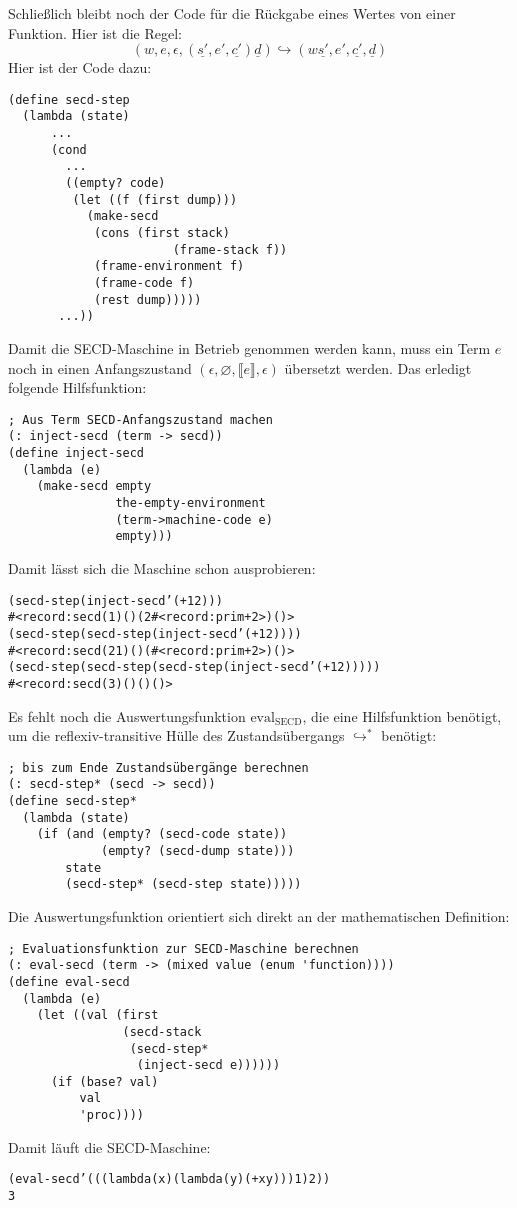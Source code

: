 %
Schließlich bleibt noch der Code für die Rückgabe eines Wertes von
einer Funktion.  Hier ist die Regel:
%
\begin{displaymath}
  (w, e, \epsilon, (\underline{s'}, e', \underline{c'}) \underline{d})
  \hookrightarrow
  (w\underline{s'}, e', \underline{c'}, \underline{d})
\end{displaymath}
%
Hier ist der Code dazu:
%
\begin{verbatim}
(define secd-step
  (lambda (state)
      ...
      (cond
        ...
        ((empty? code)
         (let ((f (first dump)))
           (make-secd
            (cons (first stack)
                       (frame-stack f))
            (frame-environment f)
            (frame-code f)
            (rest dump)))))
       ...))
\end{verbatim}
%
Damit die SECD-Maschine in Betrieb genommen werden kann, muss ein Term
$e$ noch in einen Anfangszustand $(\epsilon, \varnothing, \llbracket
e\rrbracket, \epsilon)$ übersetzt werden.  Das erledigt folgende
Hilfsfunktion:
%
\begin{verbatim}
; Aus Term SECD-Anfangszustand machen
(: inject-secd (term -> secd))
(define inject-secd
  (lambda (e)
    (make-secd empty
               the-empty-environment
               (term->machine-code e)
               empty)))
\end{verbatim}
%
Damit lässt sich die Maschine schon ausprobieren:
%
\begin{alltt}
(secd-step (inject-secd '(+ 1 2)))
\evalsto{}#<record:secd (1) () (2 #<record:prim + 2>) ()>
(secd-step (secd-step (inject-secd '(+ 1 2))))
\evalsto{}#<record:secd (2 1) () (#<record:prim + 2>) ()>
(secd-step (secd-step (secd-step (inject-secd '(+ 1 2)))))
\evalsto{}#<record:secd (3) () () ()>
\end{alltt}
%
Es fehlt noch die Auswertungsfunktion $\mathrm{eval}_\mathrm{SECD}$,
die eine Hilfsfunktion benötigt, um die reflexiv-transitive Hülle des
Zustandsübergangs $\hookrightarrow^*$ benötigt:
%
\begin{verbatim}
; bis zum Ende Zustandsübergänge berechnen
(: secd-step* (secd -> secd))
(define secd-step*
  (lambda (state)
    (if (and (empty? (secd-code state))
             (empty? (secd-dump state)))
        state
        (secd-step* (secd-step state)))))
\end{verbatim}
%
Die Auswertungsfunktion orientiert sich direkt an der mathematischen
Definition:
%
\begin{verbatim}
; Evaluationsfunktion zur SECD-Maschine berechnen
(: eval-secd (term -> (mixed value (enum 'function))))
(define eval-secd
  (lambda (e)
    (let ((val (first
                (secd-stack
                 (secd-step* 
                  (inject-secd e))))))
      (if (base? val)
          val
          'proc))))
\end{verbatim}
%
Damit läuft die SECD-Maschine:
%
\begin{alltt}
(eval-secd '(((lambda (x) (lambda (y) (+ x y))) 1) 2))
\evalsto{}3
\end{alltt}


